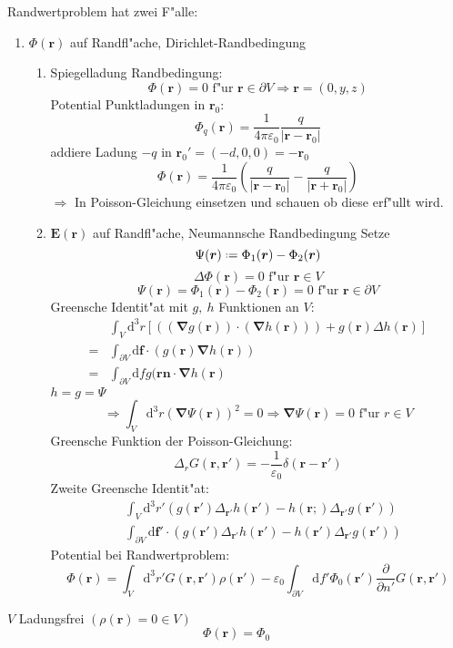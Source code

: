 \documentclass[titlepage,11pt,a4paper,ngerman]{report}
\newcommand*{\defeq}{\mathrel{\vcenter{\baselineskip0.5ex \lineskiplimit0pt \hbox{\scriptsize.}\hbox{\scriptsize.}}}=}
\newcommand{\dd}{\mathrm{d}}
\renewcommand{\vec}[1]{\bm{#1}}
\newcommand{\vabla}{\vec{\nabla}}
\newcommand{\vepsilon}{\varepsilon}
\begin{document}
Randwertproblem hat zwei F"alle:
\begin{enumerate}
\item $\Phi(\vec{r})$ auf Randfl"ache, Dirichlet-Randbedingung
\begin{enumerate}
\item Spiegelladung
Randbedingung: \[\Phi(\vec{r})=0\textrm{ f"ur }\vec{r}\in\partial V\Rightarrow\vec{r}=(0,y,z)\]
Potential Punktladungen in $\vec{r}_0$:
\[\Phi_q(\vec{r})=\frac{1}{4\pi\vepsilon_0}\frac{q}{|\vec{r}-\vec{r}_0|}\]
addiere Ladung $-q$ in $\vec{r}_0'=(-d,0,0)=-\vec{r}_0$
\[\Phi(\vec{r})=\frac{1}{4\pi\vepsilon_0}\left(\frac{q}{|\vec{r}-\vec{r}_0|}-\frac{q}{|\vec{r}+\vec{r}_0|}\right)\]
$\Rightarrow$ In Poisson-Gleichung einsetzen und schauen ob diese erf"ullt wird.
\item $\vec{E}(\vec{r})$ auf Randfl"ache, Neumannsche Randbedingung
Setze
\[\Psi(\vec{r})\defeq\Phi_1(\vec{r})-\Phi_2(\vec{r})\]
\[\Delta\Phi(\vec{r})=0\textrm{ f"ur }\vec{r}\in V\]
\[\Psi(\vec{r})=\Phi_1(\vec{r})-\Phi_2(\vec{r})=0\textrm{ f"ur }\vec{r}\in\partial V\]
Greensche Identit"at mit $g,\ h$ Funktionen an $V$:
\begin{align*}
&\int_V\dd^3r[((\vabla g(\vec{r}))\cdot(\vabla h(\vec{r})))+g(\vec{r})\Delta h(\vec{r})]\\
=&\int_{\partial V}\dd\vec{f}\cdot(g(\vec{r})\vabla h(\vec{r}))\\
=&\int_{\partial V}\dd fg(\vec{r}\vec{n}\cdot\vabla h(\vec{r})
\end{align*}
$h=g=\Psi$
\[\Rightarrow\int_V\dd^3r(\vabla\Psi(\vec{r}))^2=0
\Rightarrow\vabla\Psi(\vec{r})=0\textrm{ f"ur }r\in V\]
Greensche Funktion der Poisson-Gleichung:
\[\Delta_rG(\vec{r},\vec{r}')=-\frac{1}{\vepsilon_0}\delta(\vec{r}-\vec{r}')\]
Zweite Greensche Identit"at:
\begin{align*}
&\int_V\dd^3r'(g(\vec{r}')\Delta_{\vec{r}'}h(\vec{r}')-h(\vec{r};)\Delta_{\vec{r}'}g(\vec{r}'))\\
&\int_{\partial V}\dd\vec{f}'\cdot(g(\vec{r}')\Delta_{\vec{r}'}h(\vec{r}')-h(\vec{r}')\Delta_{\vec{r}'}g(\vec{r}'))
\end{align*}
Potential bei Randwertproblem:
\[\Phi(\vec{r})=\int_V\dd^3r'G(\vec{r},\vec{r}')\rho(\vec{r}')-\vepsilon_0\int_{\partial V}\dd f'\Phi_0(\vec{r}')\frac{\partial}{\partial n'}G(\vec{r},\vec{r}')\]
\end{enumerate}
\end{enumerate}

$V$ Ladungsfrei $(\rho(\vec{r})=0\in V)$
\[\Phi(\vec{r})=\Phi_0\]
\end{document}
